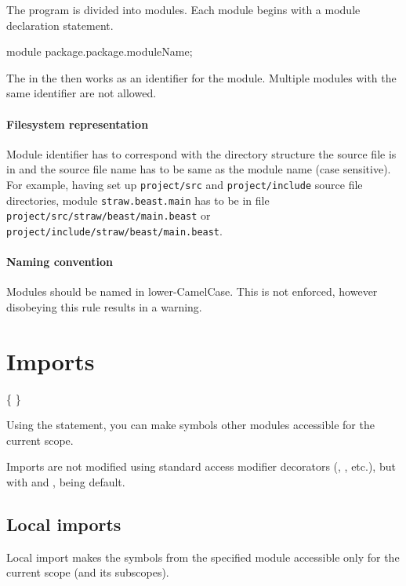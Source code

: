 The program is divided into modules. Each module begins with a module declaration statement.
\begin{code}
module package.package.moduleName;
\end{code}

The  in the  then works as an identifier for the module. Multiple modules with the same identifier are not allowed.

\paragraph{Filesystem representation} Module identifier has to correspond with the directory structure the source file is in and the source file name has to be same as the module name (case sensitive). For example, having set up \verb|project/src| and \verb|project/include| source file directories, module \verb|straw.beast.main| has to be in file \verb|project/src/straw/beast/main.beast| or \verb|project/include/straw/beast/main.beast|.

\paragraph{Naming convention} Modules should be named in lower-CamelCase. This is not enforced, however disobeying this rule results in a warning.

\section{Imports} \label{imports}
\begin{grammar}
	 \{  \}   \kwd{;}
\end{grammar}

Using the  statement, you can make symbols other modules accessible for the current scope.

Imports are not modified using standard access modifier decorators (, , etc.), but with  and ,  being default.

\subsection{Local imports} \label{decorator:local}
Local import makes the symbols from the specified module accessible only for the current scope (and its subscopes).

